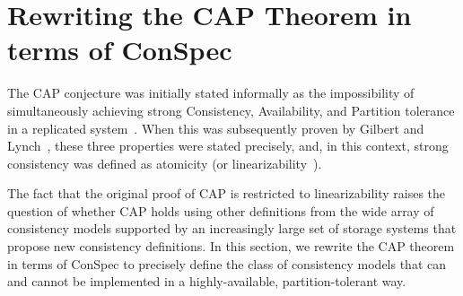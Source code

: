 \documentclass[conference]{IEEEtran}
\begin{document}
	
	\section{Rewriting the CAP Theorem in terms of ConSpec}\label{sec:cap}
	The CAP conjecture was initially stated informally as the impossibility of simultaneously achieving strong Consistency, Availability, and Partition tolerance in a replicated system~\cite{brew:cap}. When this was subsequently proven by Gilbert and Lynch~\cite{Gilbert:2002:BCF:564585.564601}, these three properties were stated precisely, and, in this context, strong consistency was defined as atomicity (or linearizability~\cite{Herlihy:1990:LCC:78969.78972}).
	
	The fact that the original proof of CAP is restricted to linearizability raises the question of whether CAP holds using other definitions from
	the wide array of consistency models supported by an increasingly large set of storage systems that propose new consistency definitions.
	In this section, we rewrite the CAP theorem in terms of ConSpec to precisely define the class of consistency models that can and cannot be implemented in a highly-available, partition-tolerant way.
	
\end{document}
